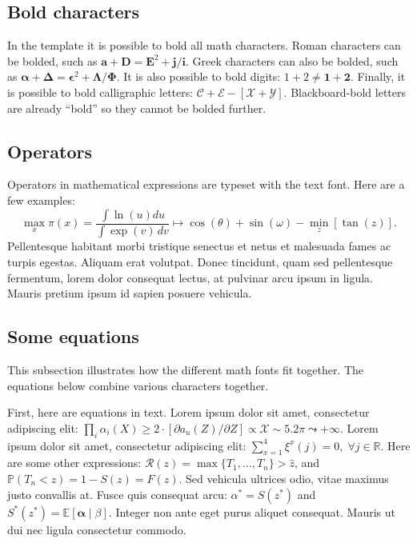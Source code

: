 \documentclass[letterpaper,11pt,leqno]{article}
\begin{document}
\subsection{Bold characters}

In the template it is possible to bold all math characters. Roman characters can be bolded, such as $\bm{a} + \bm{D} = \bm{E}^2 + \bm{j}/\bm{i}$. Greek characters can also be bolded, such as $\bm{\alpha} + \bm{\Delta} = \bm{\epsilon}^2 + \bm{\Lambda}/\bm{\Phi}$. It is also possible to bold digits: $1 + 2 \neq \bm{1} + \bm{2}$. Finally, it is possible to bold calligraphic letters: $\bm{\mathcal{C}} + \bm{\mathcal{E}} - [\bm{\mathcal{X}}+\bm{\mathcal{Y}}]$. Blackboard-bold letters are already ``bold'' so they cannot be bolded further.

\subsection{Operators} 

Operators in mathematical expressions are typeset with the text font. Here are a few examples: 
\begin{equation*}
\max_x \pi(x) = \frac{\int \ln(u)du}{\int\exp(v)\,dv} \mapsto \cos(\theta) + \sin(\omega) - \min_z[\tan(z)].
\end{equation*}
Pellentesque habitant morbi tristique senectus et netus et malesuada fames ac turpis egestas. Aliquam erat volutpat. Donec tincidunt, quam sed pellentesque fermentum, lorem dolor consequat lectus, at pulvinar arcu ipsum in ligula. Mauris pretium ipsum id sapien posuere vehicula. 

\subsection{Some equations} 

This subsection illustrates how the different math fonts fit together. The equations below combine various characters together.

First, here are equations in text. Lorem ipsum dolor sit amet, consectetur adipiscing elit: $\prod_i\alpha_i(X) \geq 2 \cdot [\partial a_u(Z)/\partial Z] \propto \mathcal{X} \sim 5.2\pi \leadsto +\infty$. Lorem ipsum dolor sit amet, consectetur adipiscing elit: $\sum_{x=1}^4 \xi^x(j)=0, \; \forall j\in \mathbb{R}$. Here are some other expressions: $\mathcal{R}(z) = \max\{T_1,\ldots,T_{n}\} > \hat{z}$, and  $\mathbb{P}(T_n < z) = 1 - S(z) = F(z)$.  Sed vehicula ultrices odio, vitae maximus justo convallis at. Fusce quis consequat arcu: $\alpha^* = S(z^*)$ and $S^*(z^*)=\mathbb{E}[\bm{\alpha}\mid \beta]$. Integer non ante eget purus aliquet consequat. Mauris ut dui nec ligula consectetur commodo.
\end{document}
